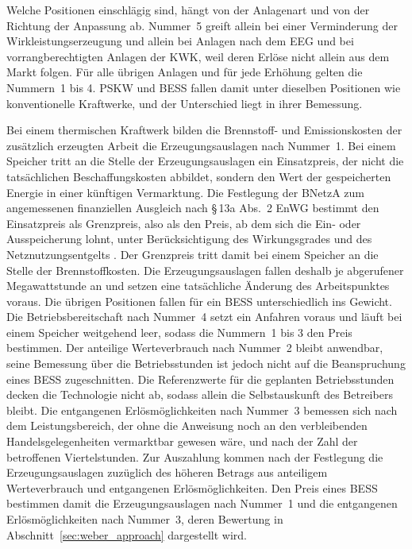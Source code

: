 Welche Positionen einschlägig sind, hängt von der Anlagenart und von der Richtung der Anpassung ab.
Nummer~5 greift allein bei einer Verminderung der Wirkleistungserzeugung und allein bei Anlagen nach dem \ac{EEG} und bei vorrangberechtigten Anlagen der \ac{KWK}, weil deren Erlöse nicht allein aus dem Markt folgen.
Für alle übrigen Anlagen und für jede Erhöhung gelten die Nummern~1 bis 4.
\ac{PSKW} und \ac{BESS} fallen damit unter dieselben Positionen wie konventionelle Kraftwerke, und der Unterschied liegt in ihrer Bemessung.

Bei einem thermischen Kraftwerk bilden die Brennstoff- und Emissionskosten der zusätzlich erzeugten Arbeit die Erzeugungsauslagen nach Nummer~1.
Bei einem Speicher tritt an die Stelle der Erzeugungsauslagen ein Einsatzpreis, der nicht die tatsächlichen Beschaffungskosten abbildet, sondern den Wert der gespeicherten Energie in einer künftigen Vermarktung.
Die Festlegung der \ac{BNetzA} zum angemessenen finanziellen Ausgleich nach §\,13a Abs.~2 \ac{EnWG} bestimmt den Einsatzpreis als Grenzpreis, also als den Preis, ab dem sich die Ein- oder Ausspeicherung lohnt, unter Berücksichtigung des Wirkungsgrades und des Netznutzungsentgelts \cite{bundesnetzagentur_anlage1_2024}.
Der Grenzpreis tritt damit bei einem Speicher an die Stelle der Brennstoffkosten.
Die Erzeugungsauslagen fallen deshalb je abgerufener Megawattstunde an und setzen eine tatsächliche Änderung des Arbeitspunktes voraus.
Die übrigen Positionen fallen für ein \ac{BESS} unterschiedlich ins Gewicht.
Die Betriebsbereitschaft nach Nummer~4 setzt ein Anfahren voraus und läuft bei einem Speicher weitgehend leer, sodass die Nummern~1 bis 3 den Preis bestimmen.
Der anteilige Werteverbrauch nach Nummer~2 bleibt anwendbar, seine Bemessung über die Betriebsstunden ist jedoch nicht auf die Beanspruchung eines \ac{BESS} zugeschnitten.
Die Referenzwerte für die geplanten Betriebsstunden decken die Technologie nicht ab, sodass allein die Selbstauskunft des Betreibers bleibt.
Die entgangenen Erlösmöglichkeiten nach Nummer~3 bemessen sich nach dem Leistungsbereich, der ohne die Anweisung noch an den verbleibenden Handelsgelegenheiten vermarktbar gewesen wäre, und nach der Zahl der betroffenen Viertelstunden.
Zur Auszahlung kommen nach der Festlegung die Erzeugungsauslagen zuzüglich des höheren Betrags aus anteiligem Werteverbrauch und entgangenen Erlösmöglichkeiten.
Den Preis eines \ac{BESS} bestimmen damit die Erzeugungsauslagen nach Nummer~1 und die entgangenen Erlösmöglichkeiten nach Nummer~3, deren Bewertung in Abschnitt~\ref{sec:weber_approach} dargestellt wird.

